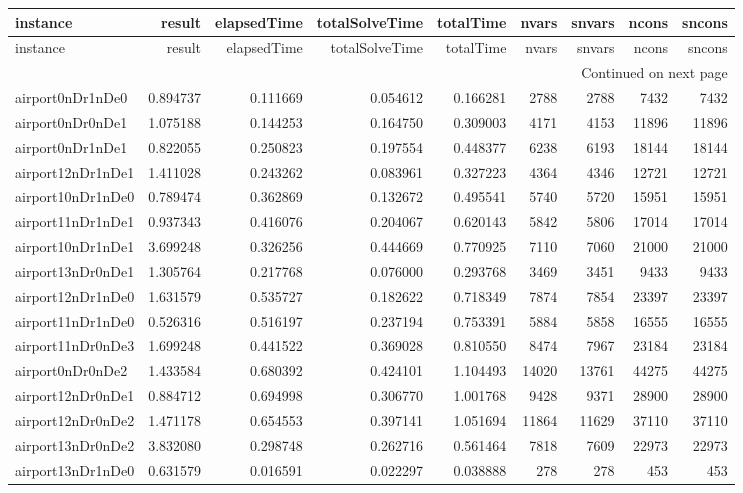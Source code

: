 \begin{longtable}{|l|r|r|r|r|r|r|r|r|}
\toprule
instance & result & elapsedTime & totalSolveTime & totalTime & nvars & snvars & ncons & sncons \\
\midrule
\endfirsthead
\toprule
instance & result & elapsedTime & totalSolveTime & totalTime & nvars & snvars & ncons & sncons \\
\midrule
\endhead
\midrule
\multicolumn{9}{r}{Continued on next page} \\
\midrule
\endfoot
\bottomrule
\endlastfoot
airport0nDr1nDe0 & 0.894737 & 0.111669 & 0.054612 & 0.166281 & 2788 & 2788 & 7432 & 7432 \\
airport0nDr0nDe1 & 1.075188 & 0.144253 & 0.164750 & 0.309003 & 4171 & 4153 & 11896 & 11896 \\
airport0nDr1nDe1 & 0.822055 & 0.250823 & 0.197554 & 0.448377 & 6238 & 6193 & 18144 & 18144 \\
airport12nDr1nDe1 & 1.411028 & 0.243262 & 0.083961 & 0.327223 & 4364 & 4346 & 12721 & 12721 \\
airport10nDr1nDe0 & 0.789474 & 0.362869 & 0.132672 & 0.495541 & 5740 & 5720 & 15951 & 15951 \\
airport11nDr1nDe1 & 0.937343 & 0.416076 & 0.204067 & 0.620143 & 5842 & 5806 & 17014 & 17014 \\
airport10nDr1nDe1 & 3.699248 & 0.326256 & 0.444669 & 0.770925 & 7110 & 7060 & 21000 & 21000 \\
airport13nDr0nDe1 & 1.305764 & 0.217768 & 0.076000 & 0.293768 & 3469 & 3451 & 9433 & 9433 \\
airport12nDr1nDe0 & 1.631579 & 0.535727 & 0.182622 & 0.718349 & 7874 & 7854 & 23397 & 23397 \\
airport11nDr1nDe0 & 0.526316 & 0.516197 & 0.237194 & 0.753391 & 5884 & 5858 & 16555 & 16555 \\
airport11nDr0nDe3 & 1.699248 & 0.441522 & 0.369028 & 0.810550 & 8474 & 7967 & 23184 & 23184 \\
airport0nDr0nDe2 & 1.433584 & 0.680392 & 0.424101 & 1.104493 & 14020 & 13761 & 44275 & 44275 \\
airport12nDr0nDe1 & 0.884712 & 0.694998 & 0.306770 & 1.001768 & 9428 & 9371 & 28900 & 28900 \\
airport12nDr0nDe2 & 1.471178 & 0.654553 & 0.397141 & 1.051694 & 11864 & 11629 & 37110 & 37110 \\
airport13nDr0nDe2 & 3.832080 & 0.298748 & 0.262716 & 0.561464 & 7818 & 7609 & 22973 & 22973 \\
airport13nDr1nDe0 & 0.631579 & 0.016591 & 0.022297 & 0.038888 & 278 & 278 & 453 & 453 \\

\end{longtable}
